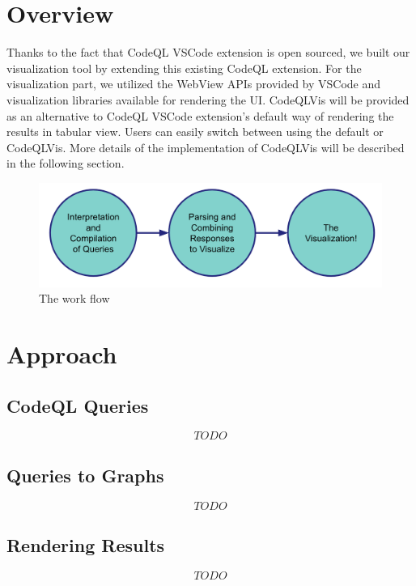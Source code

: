 \documentclass[sigplan,10pt,review]{acmart}
\begin{document}
\section{Overview}
Thanks to the fact that CodeQL VSCode extension is open sourced, we built our visualization tool by extending this existing CodeQL extension. For the visualization part, we utilized the WebView APIs provided by VSCode and visualization libraries available for rendering the UI. 
\newline
\indent CodeQLVis will be provided as an alternative to CodeQL VSCode extension's default way of rendering the results in tabular view. Users can easily switch between using the default or CodeQLVis. More details of the implementation of CodeQLVis will be described in the following section.

\begin{figure}[h]
  \centering
  \includegraphics[width=\linewidth]{work_flow}
  \caption{The work flow}
\end{figure}

\section{Approach}
\subsection{CodeQL Queries}
\[TODO\] 
\subsection{Queries to Graphs}
\[TODO\] 
\subsection{Rendering Results}
\[TODO\] 
\end{document}
